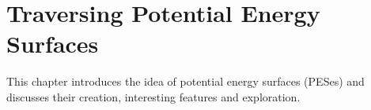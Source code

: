 \chapter{Traversing Potential Energy Surfaces}
\label{chap:pes}

This chapter introduces the idea of potential energy surfaces (PESes) and discusses their creation, interesting features and exploration.
\expand










